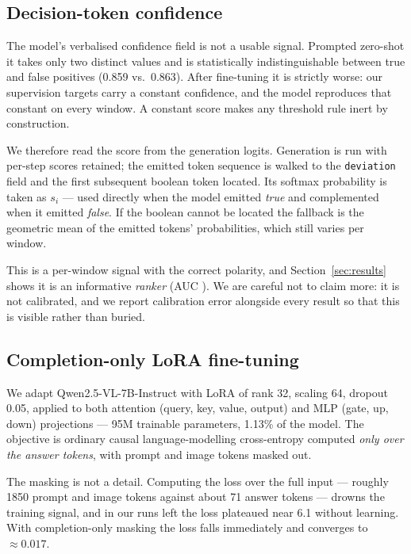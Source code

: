 \documentclass[10pt,twocolumn]{article}
\begin{document}
\subsection{Decision-token confidence}
\label{sec:confidence}

The model's verbalised confidence field is not a usable signal. Prompted
zero-shot it takes only two distinct values and is statistically indistinguishable
between true and false positives (0.859 vs.\ 0.863). After fine-tuning it is
strictly worse: our supervision targets carry a constant confidence, and the
model reproduces that constant on every window. A constant score makes any
threshold rule inert by construction.

We therefore read the score from the generation logits. Generation is run with
per-step scores retained; the emitted token sequence is walked to the
\texttt{deviation} field and the first subsequent boolean token located. Its
softmax probability is taken as $s_i$ --- used directly when the model emitted
\emph{true} and complemented when it emitted \emph{false}. If the boolean cannot
be located the fallback is the geometric mean of the emitted tokens'
probabilities, which still varies per window.

This is a per-window signal with the correct polarity, and
Section~\ref{sec:results} shows it is an informative \emph{ranker}
(AUC \resAUC{}). We are careful not to claim more: it is not calibrated, and we
report calibration error alongside every result so that this is visible rather
than buried.

\subsection{Completion-only LoRA fine-tuning}

We adapt Qwen2.5-VL-7B-Instruct \citep{bai2025qwen25vl} with LoRA
\citep{hu2022lora} of rank 32, scaling 64, dropout 0.05, applied to both attention
(query, key, value, output) and MLP (gate, up, down) projections --- 95M
trainable parameters, 1.13\% of the model. The objective is ordinary causal
language-modelling cross-entropy computed \emph{only over the answer tokens},
with prompt and image tokens masked out.

The masking is not a detail. Computing the loss over the full input --- roughly
1850 prompt and image tokens against about 71 answer tokens --- drowns the
training signal, and in our runs left the loss plateaued near 6.1 without
learning. With completion-only masking the loss falls immediately and converges
to $\approx 0.017$.
\end{document}
